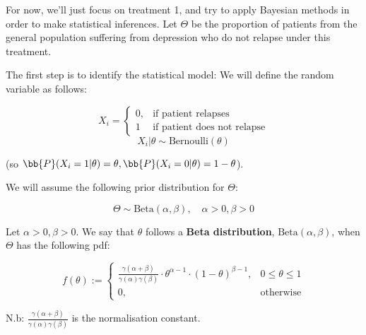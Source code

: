 \documentclass[a4paper]{article}
\begin{document}
                For now, we'll just focus on treatment 1, and try to apply
                Bayesian methods in order to make statistical inferences. Let
                $\Theta$ be the proportion of patients from the general
                population suffering from depression who do not relapse under
                this treatment.

                The first step is to identify the statistical model: We will
                define the random variable as follows:

                $$
                    X_i = \begin{cases}0, & \text{if patient relapses} \\
                    1 & \text{if patient does not relapse}\end{cases}
                $$
                $$
                    X_i | \theta \sim \text{Bernoulli}(\theta)
                $$

                (so $\bb{P}(X_i = 1 | \theta) = \theta, \bb{P}(X_i = 0 | \theta)
                = 1 - \theta$).

                We will assume the following prior distribution for $\Theta$:

                $$
                    \Theta \sim \text{Beta}(\alpha, \beta), \quad \alpha > 0,
                    \beta > 0
                $$

                \begin{definition}
                    Let $\alpha > 0, \beta > 0$. We say that $\theta$ follows a
                    \textbf{Beta distribution}, $\text{Beta}(\alpha, \beta)$,
                    when $\Theta$ has the following pdf:

                    $$
                        f(\theta) := \begin{cases}\frac{\gamma(\alpha + \beta)}
                        {\gamma(\alpha)\gamma(\beta)} \cdot \theta^{\alpha - 1}
                        \cdot (1 - \theta)^{\beta - 1}, & 0 \leq \theta \leq 1
                        \\ 0, & \text{otherwise}\end{cases}
                    $$

                    N.b: $\frac{\gamma(\alpha + \beta)}{\gamma(\alpha)\gamma
                    (\beta)}$ is the normalisation constant.
                \end{definition}
\end{document}
